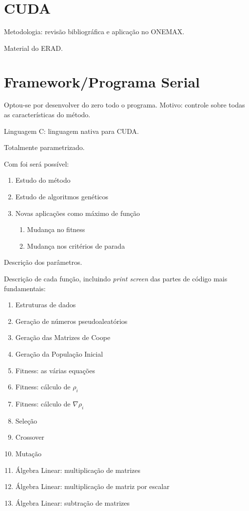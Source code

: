	
\section{CUDA}

Metodologia: revisão bibliográfica e aplicação no ONEMAX.

Material do ERAD.

\section{Framework/Programa Serial}

	Optou-se por desenvolver do zero todo o programa. Motivo: controle sobre todas as características do método.

	Linguagem C: linguagem nativa para CUDA.

	Totalmente parametrizado. 

	Com foi será possível:

	\begin{enumerate}
		\item Estudo do método 
		\item Estudo de algoritmos genéticos
		\item Novas aplicações como máximo de função
		\begin{enumerate}
			\item Mudança no fitness 
			\item Mudança nos critérios de parada
		\end{enumerate}	
	\end{enumerate}


	Descrição dos parâmetros.

	Descrição de cada função, incluindo \textit{print screen} das partes de código mais fundamentais:

	\begin{enumerate}
		\item Estruturas de dados
		\item Geração de números pseudoaleatórios
		\item Geração das Matrizes de Coope
		\item Geração da População Inicial
		\item Fitness: as várias equações
		\item Fitness: cálculo de $\rho_i$
		\item Fitness: cálculo de $\nabla\rho_i$
		\item Seleção
		\item Crossover
		\item Mutação
		\item Álgebra Linear: multiplicação de matrizes
		\item Álgebra Linear: multiplicação de matriz por escalar
		\item Álgebra Linear: subtração de matrizes
	\end{enumerate}

